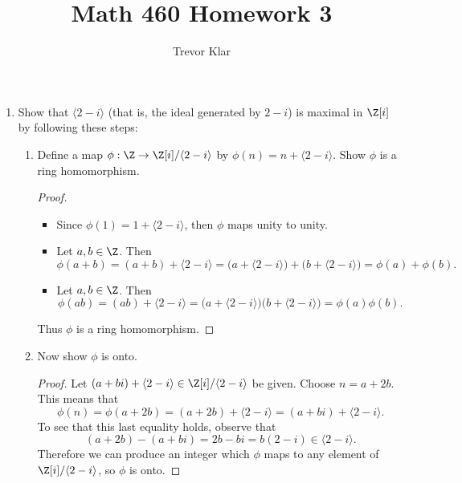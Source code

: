 \documentclass[letterpaper]{article}
\title{Math 460 \linebreak
Homework 3}
\author{Trevor Klar}
\begin{document}
\maketitle

\begin{enumerate}
  \item Show that $\langle2-i\rangle$ (that is, the ideal generated by $2 - i$) is maximal in $\Z[i]$ by following these steps:
  	\begin{enumerate}[label=\alph*.]
  	\item Define a map $\phi:\Z\to\Z[i]/\langle2-i\rangle$ by $\phi(n)=n+\langle2-i\rangle$. Show $\phi$ is a ring homomorphism.
  	\begin{proof}\mbox{}
  		\begin{itemize}
  		\item Since $\phi(1)=1+\langle2-i\rangle$, then $\phi$ maps unity to unity.
  		\item Let $a, b \in \Z$. Then
  		$$\phi(a+b)=(a+b)+\langle2-i\rangle=\big(a+\langle2-i\rangle\big)+\big(b+\langle2-i\rangle\big)=\phi(a)+\phi(b).$$
  		\item Let $a, b \in \Z$. Then
  		$$\phi(ab)=(ab)+\langle2-i\rangle=\big(a+\langle2-i\rangle\big)\big(b+\langle2-i\rangle\big)=\phi(a)\phi(b).$$
  		\end{itemize}
  		Thus $\phi$ is a ring homomorphism.
  	\end{proof}

  	\item Now show $\phi$ is onto.
  	\begin{proof}
  		Let $(a+bi)+\langle2-i\rangle\in \Z[i]/\langle2-i\rangle$ be given. Choose $n=a+2b$. This means that
  		$$\phi(n)=\phi(a+2b)=(a+2b)+\langle2-i\rangle=(a+bi)+\langle2-i\rangle.$$
  		To see that this last equality holds, observe that
  		$$(a+2b)-(a+bi)=2b-bi=b(2-i)\in\langle2-i\rangle.$$
  		Therefore we can produce an integer which $\phi$ maps to any element of $\Z[i]/\langle2-i\rangle$, so $\phi$ is onto.
  	\end{proof}


\end{enumerate}
\end{enumerate}
\end{document}
